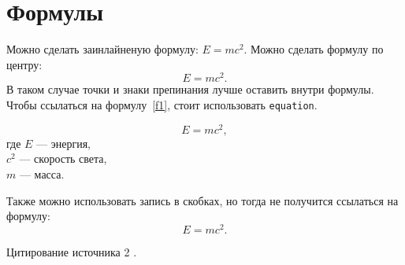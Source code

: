 \section{Формулы}

Можно сделать заинлайненую формулу: $E = mc^2$. Можно сделать формулу по центру: $$E = mc^2.$$ В таком случае точки и знаки препинания лучше оставить внутри формулы. Чтобы ссылаться на формулу~\ref{f1}, стоит использовать \texttt{equation}.

\begin{equation}\label{f1}
    E = mc^2,
\end{equation}
где $E$ --- энергия, \\ $c^2$ --- скорость света, \\ $m$ --- масса. 

Также можно использовать запись в скобках, но тогда не получится ссылаться на формулу:
\[
    E = mc^2.
\]



\lipsum[1-3]

Цитирование источника 2 \cite{cite_1_1}.
